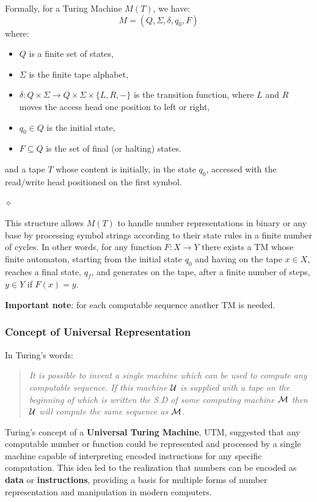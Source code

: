 \begin{definition}
Formally, for a Turing Machine \( M(T) \), we have:
\[
M = (Q, \Sigma, \delta, q_0, F)
\]
where:
\begin{itemize}
    \item \( Q \) is a finite set of states,
    \item \( \Sigma \) is the finite tape alphabet,
    \item \( \delta: Q \times \Sigma \to Q \times \Sigma \times \{L, R, -\} \) is the transition function, where $L$ and $R$ moves the access head one position to left or right,
    \item \( q_0 \in Q \) is the initial state,
    \item \( F \subseteq Q \) is the set of final (or halting) states.
\end{itemize}
and a tape $T$ whose content is initially, in the state $q_0$,  accessed with the read/write head positioned on the first symbol.

$\diamond$
\end{definition}
This structure allows \( M(T) \) to handle number representations in binary or any base by processing symbol strings according to their state rules in a finite number of cycles. In other words, for any function $F: X \rightarrow Y$ there exists a TM whose finite automaton, starting from the initial state $q_0$ and having on the tape $x \in X$, reaches a final state, $q_f$, and generates on the tape, after a finite number of steps, $y \in Y$ if $F(x) = y$.

{\bf Important note}: for each computable sequence another TM is needed.

\subsubsection{Concept of Universal Representation}

In Turing's words:
\begin{quote}
{\em It is possible to invent a single machine which can be used to compute
any computable sequence. If this machine $\cal U$ is supplied with a tape on
the beginning of which is written the S.D of some computing machine $\cal M$
then $\cal U$ will compute the same sequence as $\cal M$.} \cite{Turing36}
\end{quote}

Turing’s concept of a \textbf{Universal Turing Machine}, UTM, suggested that any computable number or function could be represented and processed by a single machine capable of interpreting encoded instructions for any specific computation. This idea led to the realization that numbers can be encoded as \textbf{data} or \textbf{instructions}, providing a basis for multiple forms of number representation and manipulation in modern computers.

